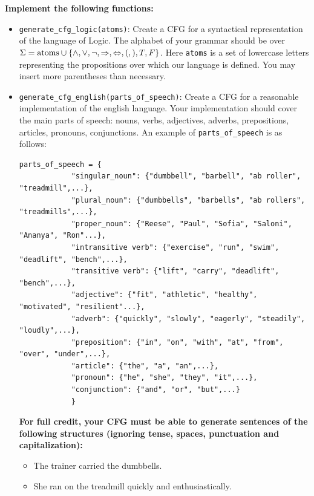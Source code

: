 \documentclass{article}
\begin{document}
\begin{tcolorbox}[enhanced,interior style={top color=Dandelion!20,bottom color=Dandelion!30}]
    \textbf{Implement the following functions:}

    \begin{itemize}
        \item \lstinline{generate_cfg_logic(atoms)}: Create a CFG for a syntactical representation of the language of Logic. The alphabet of your grammar should be over $\Sigma = \text{\lstinline{atoms}} \cup \{\land, \lor, \neg, \Rightarrow, \Leftrightarrow, (, ), T, F\}$. Here \lstinline{atoms} is a set of lowercase letters representing the propositions over which our language is defined. You may insert more parentheses than necessary.
        \item
        \lstinline{generate_cfg_english(parts_of_speech)}: Create a CFG for a reasonable implementation of the english language.
        Your implementation should cover the main parts of speech: nouns, verbs, adjectives, adverbs, prepositions, articles, pronouns, conjunctions. An example of \lstinline{parts_of_speech} is as follows:
        \begin{lstlisting}[belowskip=-10pt]
        parts_of_speech = {
            "singular_noun": {"dumbbell", "barbell", "ab roller", "treadmill",...},
            "plural_noun": {"dumbbells", "barbells", "ab rollers", "treadmills",...},
            "proper_noun": {"Reese", "Paul", "Sofia", "Saloni", "Ananya", "Ron"...},
            "intransitive verb": {"exercise", "run", "swim", "deadlift", "bench",...},
            "transitive verb": {"lift", "carry", "deadlift", "bench",...},
            "adjective": {"fit", "athletic", "healthy", "motivated", "resilient"...},
            "adverb": {"quickly", "slowly", "eagerly", "steadily", "loudly",...},
            "preposition": {"in", "on", "with", "at", "from", "over", "under",...},
            "article": {"the", "a", "an",...},
            "pronoun": {"he", "she", "they", "it",...},
            "conjunction": {"and", "or", "but",...}
            }
            \end{lstlisting}
            \textbf{For full credit, your CFG must be able to generate sentences of the following structures (ignoring tense, spaces, punctuation and capitalization):}
            \begin{itemize}
                \item The trainer carried the dumbbells.
                \item She ran on the treadmill quickly and enthusiastically.

\end{itemize}
\end{itemize}
\end{tcolorbox}
\end{document}
